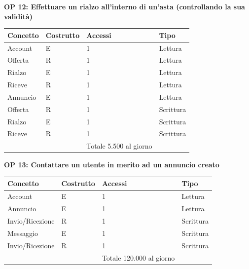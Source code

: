 \documentclass[a4paper,12pt]{report}
\begin{document}
            \textbf{OP 12: Effettuare un rialzo all’interno di un’asta (controllando la sua validità)}
        	\begin{table}[H]
            \centering
             \begin{tabular}{||l l l l||}
             \hline
             Concetto & Costrutto & Accessi & Tipo \\ [0.5ex] 
             \hline\hline
             Account & E & 1 & Lettura \\ 
             Offerta & R & 1 & Lettura \\ 
             Rialzo & E & 1 & Lettura \\ 
             Riceve & R & 1 & Lettura \\ 
             Annuncio & E & 1 & Lettura \\ 
             Offerta & R & 1 & Scrittura \\ 
             Rialzo & E & 1 & Scrittura \\ 
             Riceve & R & 1 & Scrittura \\ 
             \hline
                &   & Totale  5.500 al giorno &  \\ [1ex] 
             \hline
             \end{tabular}
            \end{table}

            \textbf{OP 13: Contattare un utente in merito ad un annuncio creato}
        	\begin{table}[H]
            \centering
             \begin{tabular}{||l l l l||}
             \hline
             Concetto & Costrutto & Accessi & Tipo \\ [0.5ex] 
             \hline\hline
             Account & E & 1 & Lettura \\ 
             Annuncio & E & 1 & Lettura \\ 
             Invio/Ricezione & R & 1 & Scrittura \\ 
             Messaggio & E & 1 & Scrittura \\ 
             Invio/Ricezione & R & 1 & Scrittura \\ 
             \hline
                &   & Totale  120.000 al giorno &  \\ [1ex] 
             \hline
             \end{tabular}
            \end{table}
\end{document}
